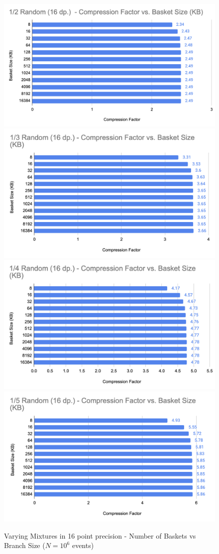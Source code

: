 \begin{figure}[h]
    \centering
    \includegraphics[width=.5\textwidth]{content/toymodel_content/4.18/1_of_2.png}
    \includegraphics[width=.5\textwidth]{content/toymodel_content/4.18/1_of_3.png}
    \includegraphics[width=.5\textwidth]{content/toymodel_content/4.18/1_of_4.png}
    \includegraphics[width=.5\textwidth]{content/toymodel_content/4.18/1_of_5.png}
    \caption{Varying Mixtures in 16 point precision - Number of Baskets vs Branch Size ($N=10^6$ events)}
    \label{fig:toymodel_418_compF_vs_basketsize}
\end{figure}
